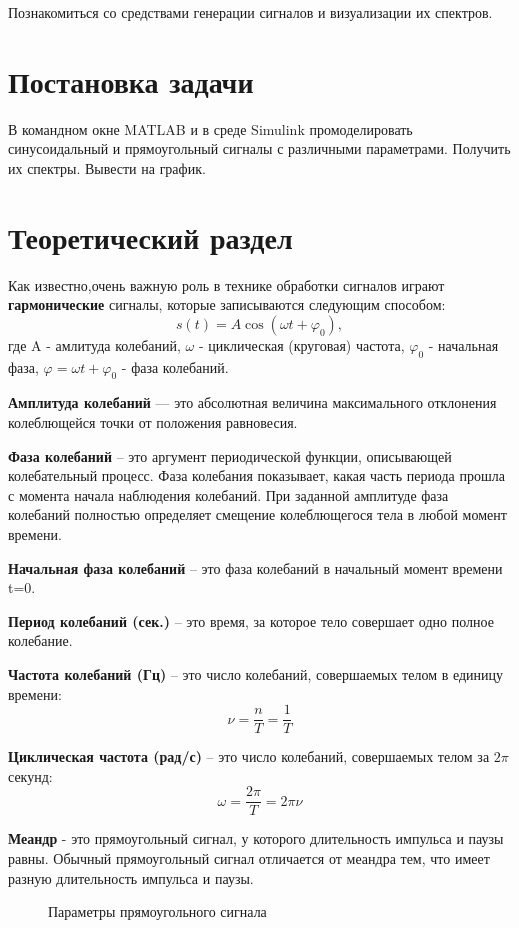 \documentclass[12pt,a4paper]{scrartcl}
\begin{document}
Познакомиться со средствами генерации сигналов и визуализации их спектров.\\

\section{Постановка задачи}
\label{sec:task}

В командном окне MATLAB и в среде Simulink промоделировать синусоидальный и прямоугольный сигналы с различными параметрами. Получить их спектры. Вывести на график.\\

\section{Теоретический раздел}
\label{sec:teoriya}
Как известно,очень важную роль в технике обработки сигналов играют \textbf{гармонические} сигналы, которые записываются следующим способом:
$$s(t)=A\cos (\omega t+\varphi _0),$$ где  A - амлитуда колебаний, $\omega$ - циклическая (круговая) частота, $\varphi _0$ - начальная фаза, $\varphi = \omega t+\varphi _0$ - фаза колебаний.

\textbf{Амплитуда колебаний} — это абсолютная величина максимального отклонения колеблющейся точки от положения равновесия.

\textbf{Фаза колебаний} – это аргумент периодической функции, описывающей колебательный процесс. Фаза колебания показывает, какая часть периода прошла с момента начала наблюдения колебаний. При заданной амплитуде фаза колебаний полностью определяет смещение колеблющегося тела в любой момент времени.

\textbf{Начальная фаза колебаний} – это фаза колебаний в начальный момент времени t=0. 

\textbf{Период колебаний (сек.)} – это время, за которое тело совершает одно полное колебание. 

\textbf{Частота колебаний (Гц)} – это число колебаний, совершаемых телом в единицу времени:
$$ \nu = \frac{n}{T} = \frac{1}{T}$$

\textbf{Циклическая частота (рад/с)} – это число колебаний, совершаемых телом за $2\pi$ секунд: 
$$\omega = \frac{2\pi}{T} = 2\pi \nu$$

\textbf{Меандр} - это прямоугольный сигнал, у которого длительность импульса и паузы равны. Обычный прямоугольный сигнал отличается от меандра тем, что имеет разную длительность импульса и паузы. 

\begin{figure}[h!]
\caption{Параметры прямоугольного сигнала}
\end{figure}
\end{document}
